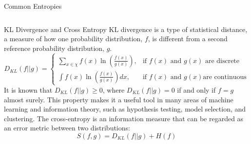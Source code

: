 \documentclass[final]{beamer}
\newlength{\onecolwid}
\begin{document}
\begin{frame}[t]
\begin{columns}[t]
\begin{column}{\onecolwid}
\begin{block}{Common Entropies}
\begin{tabular}{ |p{12cm}||p{12cm}|p{12cm}|  }
    \hline   
   \end{tabular}
\end{block}
        
        \begin{block}{KL Divergence and Cross Entropy}
            KL divergence is a type of statistical distance, a measure of how one probability distribution, $f$, is different from a second reference probability distribution, $g$.
            \begin{displaymath}
                D_{KL}(f||g) = 
                \begin{cases}
                \sum_{x \in \chi} f(x)\ln\left(\frac{f(x)}{g(x)}\right), & \text{if } f(x) \text{ and } g(x) \text{ are discrete}\\
                \int f(x)\ln\left(\frac{f(x)}{g(x)}\right)dx, & \text{if } f(x) \text{ and } g(x)  \text{are continuous} 
                \end{cases}
            \end{displaymath}
            It is known that $D_{KL}(f||g) \ge 0$, where $D_{KL}(f||g) = 0$ if and only if $f=g$ almost surely. This property makes it a useful tool in many areas of machine learning and information
theory, such as hypothesis testing, model selection, and clustering. The cross-entropy is an information measure that can be regarded as an error metric between two distributions:
            \begin{displaymath}
                   S(f,g) = D_{KL}(f||g) + H(f)
            \end{displaymath}
            
        \end{block}


\end{column}
\end{columns}
\end{frame}
\end{document}
